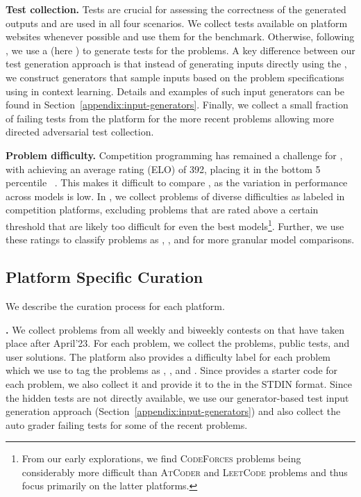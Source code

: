 \vspace{1pt}
\noindent \textbf{Test collection.}
Tests are crucial for assessing the correctness of the generated outputs and are used in all four scenarios.
We collect tests available on platform websites whenever possible and use them for the benchmark.
Otherwise, following \citet{liu2023your}, we use a \llm{} (here \gptfourturbo{}) to generate tests for the problems.
A key difference between our test generation approach is that instead of generating inputs directly using the \llm{}, we construct generators that sample inputs based on the problem specifications using in context learning.
Details and examples of such input generators can be found in Section~\ref{appendix:input-generators}.
Finally, we collect a small fraction of failing tests from the platform for the more recent problems allowing more directed adversarial test collection.

\vspace{1pt}
\noindent \textbf{Problem difficulty.}
Competition programming has remained a challenge for \llms{}, with \gptfour{} achieving an average \codeforces{} rating (ELO) of 392, placing it in the bottom 5 percentile ~\citep{openai2023gpt}. 
This makes it difficult to compare \llms{}, as the variation in performance across models is low.
In \livecodebench{}, we collect problems of diverse difficulties as labeled in competition platforms, excluding problems that are rated above a certain threshold that are likely too difficult for even the best models\footnote{From our early explorations, we find {\scriptsize	\textsc{CodeForces}} problems being considerably more difficult than {\scriptsize \textsc{AtCoder}} and {\scriptsize \textsc{LeetCode}}  problems and thus focus primarily on the latter platforms.}.
Further, we use these ratings to classify problems as \easy{}, \medium{}, and \hard{} for more granular model comparisons.




\subsection{Platform Specific Curation}
\label{subsec:platform-specific}
We describe the curation process for each platform.

\vspace{2pt}
\noindent \textbf{\leetcode{}.}
We collect problems from all weekly and biweekly contests on \leetcode{} that have taken place after April'23.
For each problem, we collect the problems, public tests, and user solutions.
The platform also provides a difficulty label for each problem which we use to tag the problems as \easy{}, \medium{}, and \hard{}.
Since \leetcode{} provides a starter code for each problem, we also collect it and provide it to the \llm{} in the STDIN format.
Since the hidden tests are not directly available, we use our generator-based test input generation approach (Section~\ref{appendix:input-generators}) and also collect the auto grader failing tests for some of the recent problems.

